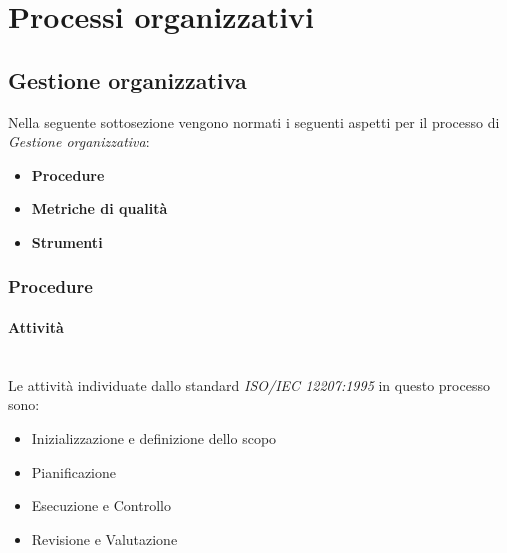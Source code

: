 \section{Processi organizzativi}

\subsection{Gestione organizzativa}
Nella seguente sottosezione vengono normati i seguenti aspetti per il 
processo di \textit{Gestione organizzativa}:
\begin{itemize}
    \item \textbf{Procedure}
    \item \textbf{Metriche di qualità}
    \item \textbf{Strumenti}
\end{itemize}

\subsubsection{Procedure}

\paragraph{Attività}
\mbox{} \\
Le attività individuate dallo standard \textit{ISO/IEC 12207:1995} in questo processo sono:
\begin{itemize}
    \item Inizializzazione e definizione dello scopo
    \item Pianificazione
    \item Esecuzione e Controllo
    \item Revisione e Valutazione
\end{itemize}

